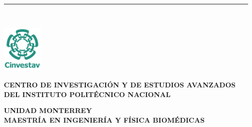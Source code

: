 %
\begin{titlepage}
	\flushright
	\hfill
	\vfill
	{\Large\thesisTitle \par}
	\rule[5pt]{\textwidth}{.4pt} \par
	{\Large\thesisName}
	\vfill
	\textit{\Large\thesisDate} \\
\end{titlepage}


\begin{titlepage}
	\tgherosfont
	\centering
	
	\noindent
	\begin{minipage}[h]{0.05\textwidth}
		\hspace{-2cm} %
		\includegraphics[width=2cm]{gfx/logospng1.png}
	\end{minipage}%
	\begin{minipage}[h]{0.95\textwidth}
		\centering
		\large 
		\textbf{CENTRO DE INVESTIGACIÓN Y DE ESTUDIOS AVANZADOS DEL INSTITUTO POLITÉCNICO NACIONAL}
	\end{minipage}


	{\large \textbf{UNIDAD MONTERREY}} \\[4mm]
	{\large \textbf{MAESTRÍA EN INGENIERÍA Y FÍSICA BIOMÉDICAS}} \\[10mm]
	



\end{titlepage}
